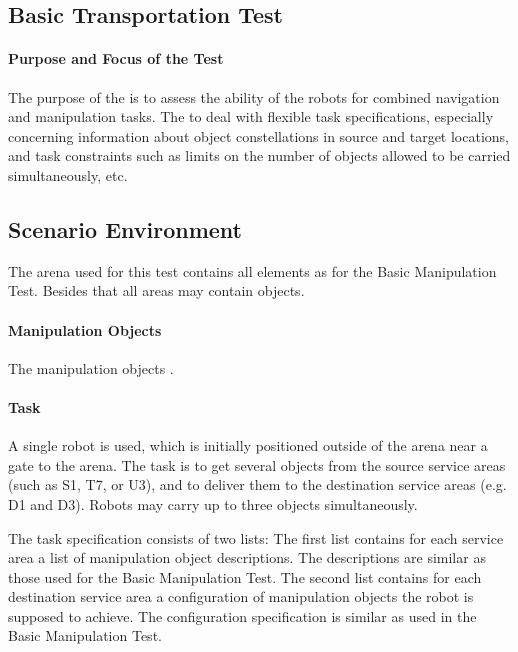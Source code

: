 \newpage
\subsection{Basic Transportation Test}

\paragraph{Purpose and Focus of the Test}
The purpose of the  is to assess the ability of the robots for combined navigation and manipulation tasks. 
The  to deal with flexible task specifications, especially concerning information about object constellations in source and target locations, and task constraints such as limits on the number of objects allowed to be carried simultaneously, etc.  

\subsection{Scenario Environment}
The arena used for this test contains all elements as for the Basic Manipulation Test. Besides that all areas may contain objects.

\paragraph{Manipulation Objects}
The manipulation objects .

\paragraph{Task}
A single robot is used, which is initially positioned outside of the arena near a gate to the arena. The task is to get several objects from the source service areas (such as S1, T7, or U3), and to deliver them to the destination service areas (e.g. D1 and D3). Robots may carry up to three objects simultaneously. 
\par
The task specification consists of two lists:
The first list contains for each service area a list of manipulation object descriptions. The descriptions are similar as those used for the Basic Manipulation Test. 
The second list contains for each destination service area a configuration of manipulation objects the robot is supposed to achieve. The configuration specification is similar as used in the Basic Manipulation Test. 

